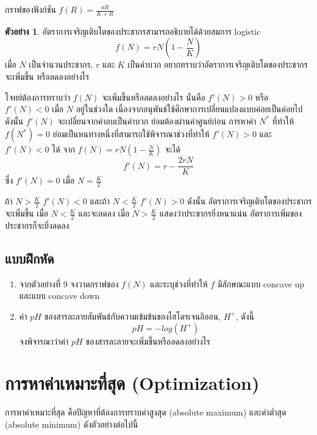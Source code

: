 \documentclass[
]{book}
\theoremstyle{definition}
\theoremstyle{definition}
\newtheorem{example}{ตัวอย่าง}[chapter]
\theoremstyle{definition}
\theoremstyle{definition}
\theoremstyle{remark}
\begin{document}
กราฟของฟังก์ชัน {\(f(R)=\frac{aR}{K+R}\)}

\begin{example}
อัตราการเจริญเติบโตของประชากรสามารถอธิบายได้ด้วยสมการ logistic
\[f(N)=rN(1- \frac{N}{K})\] เมื่อ \(N\) เป็นจำนวนประชากร, \(r\) และ \(K\)
เป็นค่าบวก อยากทราบว่าอัตราการเจริญเติบโตของประชากรจะเพิ่มขึ้น หรือลดลงอย่างไร
\end{example}

โจทย์ต้องการทราบว่า \(f(N)\) จะเพิ่มขึ้นหรือลดลงอย่างไร นั่นคือ \(f'(N)>0\) หรือ
\(f'(N)<0\) เมื่อ \(N\) อยู่ในช่วงใด เนื่องจากอนุพันธ์ใช้ศึกษาการเปลี่ยนแปลงแบบค่อยเป็นค่อยไป
ดังนั้น \(f'(N)\) จะเปลี่ยนจากค่าลบเป็นค่าบวก ย่อมต้องผ่านค่าศูนย์ก่อน การหาค่า \(N^*\)
ที่ทำให้ \(f(N^*)=0\) ย่อมเป็นหนทางหนึ่งที่สามารถใช้พิจารณาช่วงที่ทำให้ \(f'(N)>0\) และ
\(f'(N)<0\) ได้ จาก \(\displaystyle f(N)=rN(1- \frac{N}{K})\) จะได้
\[f'(N)=r- \frac{2rN}{K}\] ซึ่ง \(f'(N)=0\) เมื่อ \(N = \frac{K}{2}\)

ถ้า \(\displaystyle N> \frac{K}{2}\) \(f'(N)<0\) และถ้า
\(\displaystyle N< \frac{K}{2}\) \(f'(N)>0\) ดังนั้น
อัตราการเจริญเติบโตของประชากรจะเพิ่มขึ้น เมื่อ \(\displaystyle N< \frac{K}{2}\)
และจะลดลง เมื่อ \(\displaystyle N> \frac{K}{2}\) แสดงว่าประชากรยิ่งหนาแน่น
อัตราการเพิ่มของประชากรก็จะยิ่งลดลง

\subsection{แบบฝึกหัด}\label{uxe41uxe1auxe1auxe1duxe01uxe2buxe14-5}

\begin{enumerate}
\def\labelenumi{\arabic{enumi}.}
\item
  จากตัวอย่างที่ 9 จงวาดกราฟของ \(f(N)\) และระบุช่วงที่ทำให้ \(f\) มีลักษณะแบบ
  concave up และแบบ concave down
\item
  ค่า \(pH\) ของสารละลายสัมพันธ์กับความเข้มข้นของไฮโดรเจนอิออน, \(H^+\), ดังนี้
  \[pH=-log(H^+)\] จงพิจารณาว่าค่า \(pH\) ของสารละลายจะเพิ่มขึ้นหรือลดลงอย่างไร
\end{enumerate}

\section{การหาค่าเหมาะที่สุด (Optimization)}\label{uxe01uxe32uxe23uxe2buxe32uxe04uxe32uxe40uxe2buxe21uxe32uxe30uxe17uxe2auxe14-optimization}

การหาค่าเหมาะที่สุด คือปัญหาที่ต้องการทราบค่าสูงสุด (absolute maximum) และค่าต่ำสุด
(absolute minimum) ดังตัวอย่างต่อไปนี้
\end{document}
